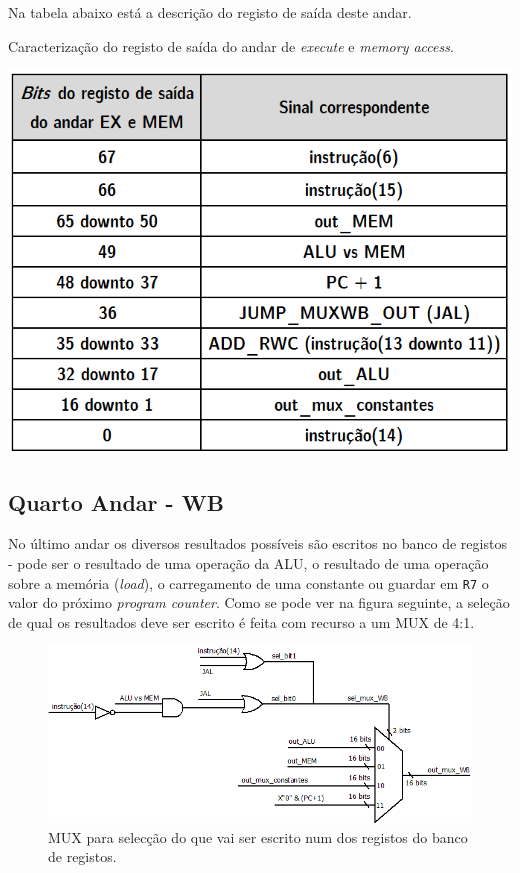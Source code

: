 \documentclass[11pt]{article}
\numberwithin{equation}{section}
\begin{document}
Na tabela abaixo está a descrição do registo de saída deste andar.

\begin{table}[h]
	\centering
	\caption{Caracterização do registo de saída do andar de \textit{execute} e \textit{memory access}.}
	\vspace{-2mm}
 	\includegraphics[keepaspectratio=true, scale=0.45]{tabelas/regEXMEM}
\end{table}

\subsection{Quarto Andar - WB}

No último andar os diversos resultados possíveis são escritos no banco de registos - pode ser o resultado de uma operação da ALU, o resultado de uma operação sobre a memória (\textit{load}), o carregamento de uma constante ou guardar em \texttt{R7} o valor do próximo \textit{program counter}. Como se pode ver na figura seguinte, a seleção de qual os resultados deve ser escrito é feita com recurso a um MUX de 4:1. 

\begin{figure}[h]
	\centering
	\includegraphics[keepaspectratio=true, scale=0.35]{imagens/WB1}
	\caption{MUX para selecção do que vai ser escrito num dos registos do banco de registos.}
	\vspace{-0.8em}
\end{figure}
\end{document}
